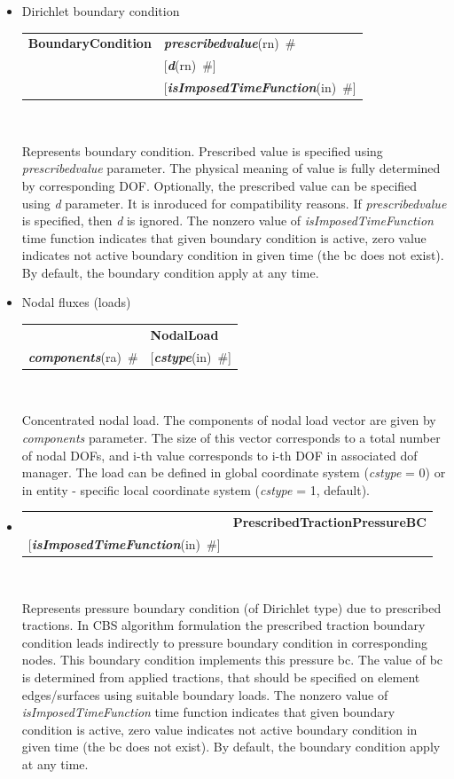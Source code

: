 \documentclass[a4paper]{article}
\makeatletter
\newcommand{\param}[1]{{\em #1}}
\newcommand{\keywordnotype}[1]{\mbox{{\it{\bf{#1}}}}}
\newcommand{\keyword}[2]{\mbox{{\keywordnotype{#1}\tiny (#2)}}}
\newcommand{\entKeywordInst}[1]{\mbox{{\bf{{#1}}}}}
\newcommand{\field}[2]{\mbox{\keyword{#1}{#2}~\#}}
\newcommand{\optField}[2]{\mbox{[\field{#1}{#2}]}}
\newenvironment{record}[1][]{\begin{tabular}{|ll}}{\end{tabular}\\}
\newcommand{\recentry}[2]{{#1}&{#2}\\}
\newcounter{rcc}
\newenvironment{record}[1][\textwidth]{\setcounter{rcc}{0}\begin{tabular*}{#1}{|ll@{\extracolsep{\fill}}r}}{\end{tabular*}\\}
\newcommand{\recentry}[2]{\ifthenelse{\value{rcc}>0}{&$\backslash$ \\}{\setcounter{rcc}{1}}{#1}&{#2}}
\makeatother
\begin{document}
\begin{itemize}
\item Dirichlet boundary condition

  \noindent
  \begin{record}[0.9\textwidth]
    \recentry{\entKeywordInst{BoundaryCondition}}{\field{prescribedvalue}{rn}}
    \recentry{}{\optField{d}{rn}}
    \recentry{}{\optField{is\-Impo\-sed\-Ti\-me\-Fun\-ction}{in}}
  \end{record}

  Represents boundary condition.
Prescribed value is specified using \param{prescribedvalue} parameter. The
physical meaning of value is fully determined by corresponding DOF.
Optionally, the prescribed value can be specified using \param{d}
parameter. It is inroduced for compatibility reasons. If
\param{prescribedvalue} is specified, then \param{d} is ignored.
The nonzero value of \param{isImposedTimeFunction} time function
indicates that given boundary condition is active, zero value
indicates not active boundary condition in given time (the bc does not
exist). By default, the boundary condition apply at any time.
\item Nodal fluxes (loads)

\noindent
\begin{record}[0.9\textwidth]
  \recentry{}{\entKeywordInst{NodalLoad}}{\field{components}{ra}} \recentry{}{\optField{cstype}{in}}
\end{record}

Concentrated nodal load. The components of nodal load vector
are given by \param{components} parameter. The size of this vector
corresponds to a total number of nodal DOFs, and i-th value
corresponds to i-th DOF in associated dof manager. The load can be defined in global coordinate system (\param{cstype} =
0) or in entity - specific local coordinate system
(\param{cstype} = 1, default).
\item \mbox{}

\noindent
\begin{record}[0.9\textwidth]
  \recentry{}{\entKeywordInst{PrescribedTractionPressureBC}}{\optField{is\-Impo\-sed\-Ti\-me\-Fun\-ction}{in}}
\end{record}

Represents pressure boundary condition (of Dirichlet type) due to
prescribed tractions.
In CBS algorithm formulation the prescribed traction
boundary condition leads indirectly to pressure boundary condition in
corresponding nodes. This boundary condition implements this pressure
bc. The value of bc is determined from applied tractions, that  should be specified on element edges/surfaces using
suitable boundary loads.
The nonzero value of \param{isImposedTimeFunction} time function
indicates that given boundary condition is active, zero value
indicates not active boundary condition in given time (the bc does not
exist). By default, the boundary condition apply at any time.
\end{itemize}
\end{document}
